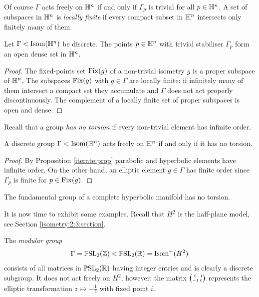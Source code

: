 Of course $\Gamma$ acts freely on $\mathbb{H}^n$ if and only if $\Gamma_p$ is trivial for all $p\in\mathbb{H}^n$. A set of subspaces in $\mathbb{H}^n$ is \emph{locally finite} if every compact subset in $\mathbb{H}^n$ intersects only finitely many of them.

\begin{prop} \label{dense:prop}
Let $\Gamma<{\rm Isom}(\mathbb{H}^n)$ be discrete. The points $p\in\mathbb{H}^n$ with trivial stabiliser $\Gamma_p$ form an open dense set in $\mathbb{H}^n$.
\end{prop}
\begin{proof}
The fixed-points set ${\rm Fix}(g)$ of a non-trivial isometry $g$ is a proper subspace of $\mathbb{H}^n$. The subspaces ${\rm Fix}(g)$ with $g\in\Gamma$ are locally finite: if infinitely many of them intersect a compact set they accumulate and $\Gamma$ does not act properly discontinuously. The complement of a locally finite set of proper subspaces is open and dense.
\end{proof}

Recall that a group \emph{has no torsion} if every non-trivial element has infinite order.

\begin{prop} \label{no:torsion:prop}
A discrete group $\Gamma < {\rm Isom}(\mathbb{H}^n)$ acts freely on $\mathbb{H}^n$ if and only if it has no torsion.
\end{prop}
\begin{proof}
By Proposition \ref{iterate:prop} parabolic and hyperbolic elements have infinite order. On the other hand, an elliptic element $g\in\Gamma$ has finite order since $\Gamma_p$ is finite for $p\in{\rm Fix}(g)$.
\end{proof}

\begin{cor}
The fundamental group of a complete hyperbolic manifold has no torsion.
\end{cor}

It is now time to exhibit some examples. Recall that $H^2$ is the half-plane model, see Section \ref{isometry:2:3:section}.

\begin{example}
The \emph{modular group} 
$$\Gamma = \mathbb{P}{\rm SL}_2(\mathbb{Z}) < \mathbb{P}{\rm SL}_2(\mathbb{R}) = {\rm Isom}^+(H^2)$$ 
consists of all matrices in $\mathbb{P}{\rm SL}_2(\mathbb{R})$ having integer entries and is clearly a discrete subgroup. It does not act freely on $H^2$, however: the matrix $\matr 01{-1}0$ represents the elliptic transformation $z\mapsto -\frac 1z$ with fixed point $i$. 
\end{example} 

